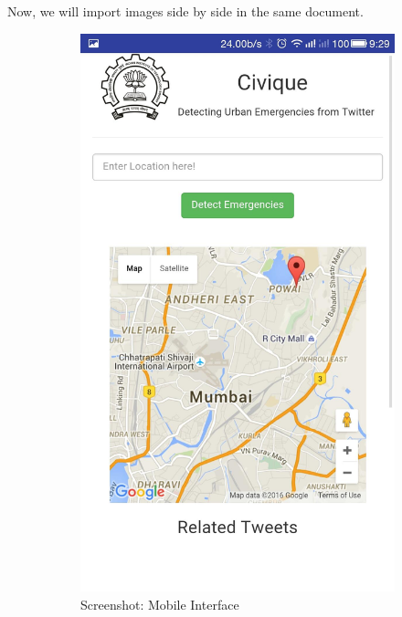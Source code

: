 \documentclass[12pt]{article}
\begin{document}
\hspace{1.5 ex} \hspace{2 ex} Now, we will import images side by side in the same document.
\begin{figure}[!h]
\captionsetup{width = .65\linewidth}
\begin{subfigure}[t]{.5\textwidth}
  \centering
  \includegraphics[width=.65\linewidth]{1}
  \caption*{ Screenshot: Mobile
Interface}
  \label{fig:sub1}
\end{subfigure}%
\begin{subfigure}[t]{.5\textwidth}
  \centering

\end{subfigure}
\end{figure}
\end{document}
